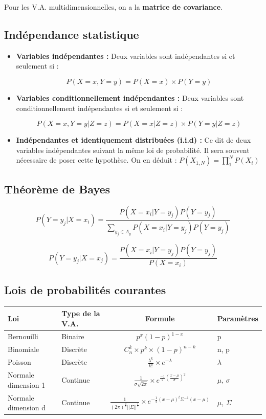 \documentclass{article}
\begin{document}
Pour les V.A. multidimensionnelles, on a la \textbf{matrice de covariance}.

\subsection{Indépendance statistique}

\begin{itemize}

\item \textbf{Variables indépendantes :} Deux variables sont indépendantes si et seulement si :

\[ P(X = x, Y = y) = P(X = x) \times P(Y = y) \]

\item \textbf{Variables conditionnellement indépendantes :} Deux variables sont conditionnellement indépendantes si et seulement si :

\[ P(X = x, Y = y | Z = z) = P(X = x | Z = z) \times P(Y = y | Z = z) \]

\item \textbf{Indépendantes et identiquement distribuées (i.i.d) :} Ce dit de deux variables indépendantes suivant la même loi de probabilité. Il sera souvent nécessaire de poser cette hypothèse. On en déduit : $P(X_{1, N} ) = \prod_{1}^{N} P(X_i)$

\end{itemize}

\subsection{Théorème de Bayes}

\[ P(Y = y_j | X = x_i) = \frac{P(X = x_i | Y = y_j) P(Y = y_j)}{\sum_{y_j \in A_y} P(X = x_i | Y = y_j) P(Y = y_j)} \]

\[ P(Y = y_j | X = x_j) = \frac{P(X = x_i | Y = y_j) P(Y = y_j)}{P(X = x_i)} \]

\subsection{Lois de probabilités courantes}

\begin{tabular}{|l|l|c|l|}
  \hline
  Loi & Type de la V.A. & Formule & Paramètres \\
  \hline
  Bernouilli & Binaire & $p^x(1-p)^{1-x}$ & p \\
  Binomiale & Discrète & $C^{k}_{n} \times p^k \times (1-p)^{n-k}$ & n, p \\
  Poisson &Discrète & $\frac{\lambda^k}{k!} \times e^{- \lambda} $ & $\lambda$ \\
  Normale dimension 1 & Continue & $\frac{1}{\sigma \sqrt{2 \pi}} \times e^{\frac{-1}{2}(\frac{x - \mu}{\sigma})^2} $ & $\mu$, $\sigma$ \\
  Normale dimension d & Continue& $\frac{1}{(2 \pi)^{\frac{d}{2}} ||\Sigma||^{\frac{1}{2}}} \times e^{- \frac{1}{2} (x - \mu)^t \Sigma^{-1} (x - \mu)}$ & $\mu$, $\Sigma$ \\ 
  \hline
\end{tabular}
\end{document}

